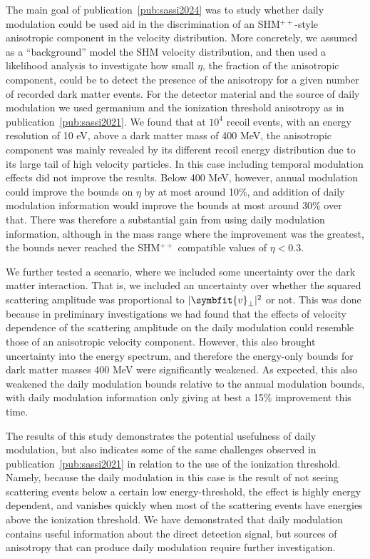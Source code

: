 \documentclass[b5paper, 10pt, twoside]{book}
\renewcommand{\vec}[1]{\symbfit{#1}}
\begin{document}
The main goal of publication~\ref{pub:sassi2024} was to study whether daily modulation could be used aid in the discrimination of an SHM$^{++}$-style anisotropic component in the velocity distribution. More concretely, we assumed as a ``background'' model the SHM velocity distribution, and then used a likelihood analysis to investigate how small $\eta$, the fraction of the anisotropic component, could be to detect the presence of the anisotropy for a given number of recorded dark matter events. For the detector material and the source of daily modulation we used germanium and the ionization threshold anisotropy as in publication~\ref{pub:sassi2021}. We found that at $10^4$ recoil events, with an energy resolution of 10 eV, above a dark matter mass of 400 MeV, the anisotropic component was mainly revealed by its different recoil energy distribution due to its large tail of high velocity particles. In this case including temporal modulation effects did not improve the results. Below 400 MeV, however, annual modulation could improve the bounds on $\eta$ by at most around 10\%, and addition of daily modulation information would improve the bounds at most around 30\% over that. There was therefore a substantial gain from using daily modulation information, although in the mass range where the improvement was the greatest, the bounds never reached the SHM$^{++}$ compatible values of $\eta<0.3$.

We further tested a scenario, where we included some uncertainty over the dark matter interaction. That is, we included an uncertainty over whether the squared scattering amplitude was proportional to $|\vec{v}_\perp|^2$ or not. This was done because in preliminary investigations we had found that the effects of velocity dependence of the scattering amplitude on the daily modulation could resemble those of an anisotropic velocity component. However, this also brought uncertainty into the energy spectrum, and therefore the energy-only bounds for dark matter masses 400 MeV were significantly weakened. As expected, this also weakened the daily modulation bounds relative to the annual modulation bounds, with daily modulation information only giving at best a 15\% improvement this time.

The results of this study demonstrates the potential usefulness of daily modulation, but also indicates some of the same challenges observed in publication~\ref{pub:sassi2021} in relation to the use of the ionization threshold. Namely, because the daily modulation in this case is the result of not seeing scattering events below a certain low energy-threshold, the effect is highly energy dependent, and vanishes quickly when most of the scattering events have energies above the ionization threshold. We have demonstrated that daily modulation contains useful information about the direct detection signal, but sources of anisotropy that can produce daily modulation require further investigation.
\end{document}
